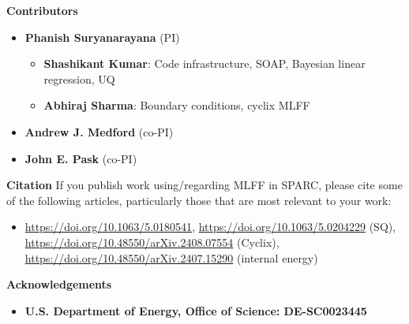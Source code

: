 

\begin{frame}[allowframebreaks]{\textbf{Contributors}} \label{Contributors}

	\begin{itemize}
	\item \textbf{Phanish Suryanarayana} (PI)
	\begin{itemize}
 	    \item \textbf{Shashikant Kumar}: Code infrastructure, SOAP, Bayesian linear regression, UQ \\    
 	    \item \textbf{Abhiraj Sharma}: Boundary conditions, cyclix MLFF \\  
 	\end{itemize}
  \item \textbf{Andrew J. Medford} (co-PI)
  \item \textbf{John E. Pask} (co-PI)

 	\end{itemize}
  
\end{frame}


\begin{frame}[allowframebreaks]{\textbf{Citation}} \label{Citation}
If you publish work using/regarding MLFF in SPARC, please cite some of the following articles, particularly those that are most relevant to your work:
\begin{itemize}
    \item \url{https://doi.org/10.1063/5.0180541}, \url{https://doi.org/10.1063/5.0204229} (SQ), \url{https://doi.org/10.48550/arXiv.2408.07554} (Cyclix), \url{https://doi.org/10.48550/arXiv.2407.15290} (internal energy)

\end{itemize}
\end{frame}


\begin{frame}[allowframebreaks]{\textbf{Acknowledgements}} \label{Acknowledgements}
\begin{itemize}
    \item \textbf{U.S. Department of Energy, Office of Science: DE-SC0023445 
        } \\
\end{itemize}
\end{frame}


